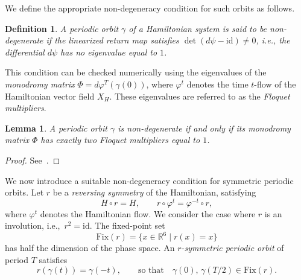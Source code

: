 \documentclass[pdflatex,sn-mathphys-ay]{sn-jnl}%
\theoremstyle{thmstyleone}%
\newtheorem{lemma}[theorem]{Lemma}%
\theoremstyle{thmstyletwo}%
\theoremstyle{thmstylethree}%
\newtheorem{definition}{Definition}%
\renewcommand{\phi}{\varphi}
\newcommand{\id}{\mathrm{id}}
\begin{document}
We define the appropriate non-degeneracy condition for such orbits as follows.

\begin{definition}
    A periodic orbit $\gamma$ of a Hamiltonian system is said to be \emph{non-degenerate} if the linearized return map satisfies $\det(d\psi - \id) \neq 0$, i.e., the differential $d\psi$ has no eigenvalue equal to $1$.
\end{definition}

This condition can be checked numerically using the eigenvalues of the \emph{monodromy matrix} $\Phi = d\phi^T(\gamma(0))$, where $\phi^t$ denotes the time $t$-flow of the Hamiltonian vector field $X_H$. These eigenvalues are referred to as the \emph{Floquet multipliers}.

\begin{lemma}
    A periodic orbit $\gamma$ is non-degenerate if and only if its monodromy matrix $\Phi$ has exactly two Floquet multipliers equal to $1$.
\end{lemma}
\begin{proof}
    See~\cite[Lemma 2.3]{moser_zehnder_notes_2005}.
\end{proof}

We now introduce a suitable non-degeneracy condition for symmetric periodic orbits.  
Let $r$ be a \emph{reversing symmetry} of the Hamiltonian, satisfying
\[
H \circ r = H, \qquad  r \circ \phi^t = \phi^{-t} \circ r,
\]
where $\phi^t$ denotes the Hamiltonian flow.  
We consider the case where $r$ is an involution, i.e.,\ $r^2 = \mathrm{id}$.  
The fixed-point set
\[
\mathrm{Fix}(r) = \{ x \in \mathbb{R}^6 \mid r(x) = x \}
\]
has half the dimension of the phase space. 
An \emph{$r$-symmetric periodic orbit} of period $T$ satisfies
\[
r(\gamma(t)) = \gamma(-t), \qquad \text{so that} \quad \gamma(0),\, \gamma(T/2) \in \mathrm{Fix}(r).
\]
\end{document}
